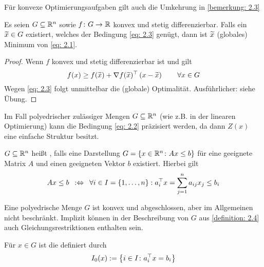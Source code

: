 Für konvexe Optimierungsaufgaben gilt auch die Umkehrung in \cref{bemerkung: 2.3}

\begin{aussage} %
	Es seien $G \subseteq \mathbb{R}^n$ sowie $\abb{f}{G}{\R}$ konvex und stetig differenzierbar. Falls ein $\widetilde{x} \in G$ existiert, welches der Bedingung \eqref{eq: 2.3} genügt, dann ist $\widetilde{x}$ (globales) Minimum von \eqref{eq: 2.1}.
\end{aussage}
\begin{proof}
	Wenn $f$ konvex und stetig differenzierbar ist und gilt
	\begin{equation*}
	f(x) \ge f(\widetilde{x}) + \nabla f(\widetilde{x})^{\top} \left( x - \widetilde{x} \right) \qquad \forall x \in G
	\end{equation*}
	Wegen \eqref{eq: 2.3} folgt unmittelbar die (globale) Optimalität. Ausführlicher: siehe Übung.
\end{proof}

Im Fall polyedrischer zulässiger Mengen $G \subseteq \mathbb{R}^n$ (wie z.B. in der linearen Optimierung) kann die Bedingung \eqref{eq: 2.2} präzisiert werden, da dann $Z(x)$ eine einfache Struktur besitzt.

\begin{definition} %
	\label{definition: 2.4}
	$G \subseteq \mathbb{R}^n$ heißt , falls eine Darstellung $G = \left\{ x \in \mathbb{R}^n \colon Ax \le b \right\}$ für eine geeignete Matrix $A$ und einen geeigneten Vektor $b$ existiert. Hierbei gilt
	\begin{equation*}
	Ax \le b \enskip \mathrel{:\Leftrightarrow} \enskip \forall i \in I = \left\{ 1,\dots,n \right\}: a_i^{\top}x = \sum_{j=1}^n a_{ij}x_j \le b_i
	\end{equation*}
\end{definition}


\begin{bemerkung} %
	Eine polyedrische Menge $G$ ist konvex und abgeschlossen, aber im Allgemeinen nicht beschränkt. Implizit können in der Beschreibung von $G$ aus \cref{definition: 2.4} auch Gleichungsrestriktionen enthalten sein.
\end{bemerkung}

\begin{definition} %
	Für $x \in G$ ist die  definiert durch 
	\begin{equation*}
	I_0(x) \mathrel{:=} \left\{ i \in I \colon a_i^{\top} x = b_i \right\}
	\end{equation*}
\end{definition}

